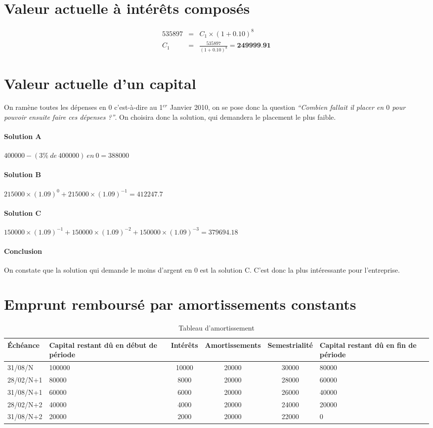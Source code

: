 \documentclass{article}
\begin{document}
	\section{Valeur actuelle à intérêts composés}

	\begin{eqnarray*}
		535897 &=& C_1 \times (1 + 0.10)^{8}\\
		C_1 &=& \frac{535897}{(1 + 0.10)^8} = \textbf{249999.91}  
	\end{eqnarray*}
	\section{Valeur actuelle d'un capital}
	On ramène toutes les dépenses en $0$ c'est-à-dire au 1$^{er}$ Janvier 2010, on se pose donc la question \textit{``Combien fallait il placer en $0$ pour pouvoir ensuite faire ces dépenses ?''}. \newline
	On choisira donc la solution, qui demandera le placement le plus faible.
	\paragraph{Solution A}
	$400000 - (3\%~de~400000)~en~0 = 388000$
	\paragraph{Solution B}
	$215000 \times (1.09)^0 + 215000 \times (1.09)^{-1} = 412247.7$
	\paragraph{Solution C}
	$150000 \times (1.09)^{-1} + 150000 \times (1.09)^{-2} + 150000 \times (1.09)^{-3} = 379694.18$
	\paragraph{Conclusion}
	On constate que la solution qui demande le moins d'argent en $0$ est la solution C.  C'est donc la plus intéressante pour l'entreprise.
	\section{Emprunt remboursé par amortissements constants}
	\begin{table}[H]
		\centering
		\begin{tabular}{|p{2cm}|p{3.6cm}|c|c|c|p{3.2cm}|}
			\hline
			\textbf{Échéance} & \textbf{Capital restant dû en début de période} & \textbf{Intérêts} & \textbf{Amortissements}& \textbf{Semestrialité} & \textbf{Capital restant dû en fin de période }\\
			\hline
			31/08/N & 100000& 10000&20000&30000&80000\\
			\hline
			28/02/N+1 & 80000&8000&20000&28000 & 60000\\
			\hline
			31/08/N+1 & 60000&6000&20000&26000&40000\\
			\hline
			28/02/N+2 & 40000& 4000&20000&24000&20000\\
			\hline
			31/08/N+2 &20000&2000&20000&22000 & 0\\ 
			\hline
		\end{tabular}
		\caption{Tableau d'amortissement}
	\end{table}
\end{document}
